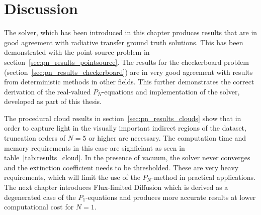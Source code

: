 \section{Discussion}

The solver, which has been introduced in this chapter produces results that are in good agreement with radiative transfer ground truth solutions. This has been demonstrated with the point source problem in section~\ref{sec:pn_results_pointsource}. The results for the checkerboard problem (section~\ref{sec:pn_results_checkerboard}) are in very good agreement with results from deterministic methods in other fields. This further demonstrates the correct derivation of the real-valued $P_N$-equations and implementation of the solver, developed as part of this thesis.

The procedural cloud results in section~\ref{sec:pn_results_clouds} show that in order to capture light in the visually important indirect regions of the dataset, truncation orders of $N=5$ or higher are necessary. The computation time and memory requirements in this case are signficiant as seen in table~\ref{tab:results_cloud}. In the presence of vacuum, the solver never converges and the extinction coefficient needs to be thresholded. These are very heavy requirements, which will limit the use of the $P_N$-method in practical applications. The next chapter introduces Flux-limited Diffusion which is derived as a degenerated case of the $P_1$-equations and produces more accurate results at lower computational cost for $N=1$.
